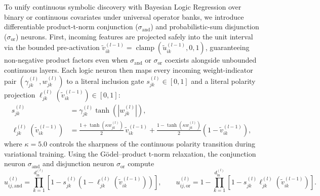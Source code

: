 \documentclass[11pt,a4paper]{article}
\begin{document}
To unify continuous symbolic discovery with Bayesian Logic Regression \citep{ruczinski2003logic, hubin2020bayesian} over binary or continuous covariates under universal operator banks, we introduce differentiable product-t-norm conjunction ($\sigma_{\text{and}}$) and probabilistic-sum disjunction ($\sigma_{\text{or}}$) neurons. First, incoming features are projected safely into the unit interval via the bounded pre-activation $\tilde{v}_{ik}^{(l-1)} = \operatorname{clamp}(\tilde{u}_{ik}^{(l-1)}, 0, 1)$, guaranteeing non-negative product factors even when $\sigma_{\text{and}}$ or $\sigma_{\text{or}}$ coexists alongside unbounded continuous layers. Each logic neuron then maps every incoming weight-indicator pair $(\gamma_{jk}^{(l)}, w_{jk}^{(l)})$ to a literal inclusion gate $s_{jk}^{(l)} \in [0, 1]$ and a literal polarity projection $\ell_{jk}^{(l)}(\tilde{v}_{ik}^{(l-1)}) \in [0, 1]$:
\begin{equation}
\label{eq:literal_projection}
\begin{aligned}
s_{jk}^{(l)} &= \gamma_{jk}^{(l)} \tanh\!\left(\left|w_{jk}^{(l)}\right|\right), \\
\ell_{jk}^{(l)}\!\left(\tilde{v}_{ik}^{(l-1)}\right) &= \frac{1 + \tanh\!\left(\kappa w_{jk}^{(l)}\right)}{2}\,\tilde{v}_{ik}^{(l-1)} + \frac{1 - \tanh\!\left(\kappa w_{jk}^{(l)}\right)}{2}\!\left(1 - \tilde{v}_{ik}^{(l-1)}\right),
\end{aligned}
\end{equation}
where $\kappa = 5.0$ controls the sharpness of the continuous polarity transition during variational training. Using the G{\"o}del--product t-norm relaxation, the conjunction neuron $\sigma_{\text{and}}$ and disjunction neuron $\sigma_{\text{or}}$ compute
\begin{equation}
\label{eq:logic_neurons}
u_{ij,\text{and}}^{(l)} = \prod_{k=1}^{d_{\text{in}}^{(l)}} \left[1 - s_{jk}^{(l)}\!\left(1 - \ell_{jk}^{(l)}(\tilde{v}_{ik}^{(l-1)})\right)\right], \qquad u_{ij,\text{or}}^{(l)} = 1 - \prod_{k=1}^{d_{\text{in}}^{(l)}} \left[1 - s_{jk}^{(l)} \ell_{jk}^{(l)}(\tilde{v}_{ik}^{(l-1)})\right].
\end{equation}
\end{document}
